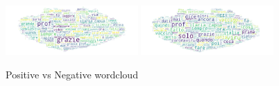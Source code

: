 \documentclass[sigchi]{acmart}
\begin{document}
 \begin{figure}[!htpb]
 \centering
\includegraphics[width=0.45\textwidth]{img/Results/Wordclouds/Sentiment_Positive_Wordcloud.png}
\includegraphics[width=0.45\textwidth]{img/Results/Wordclouds/Sentiment_Negative_Wordcloud.png}
\caption{Positive vs Negative wordcloud}
    \label{fig:my_label}
\end{figure}


\end{document}
